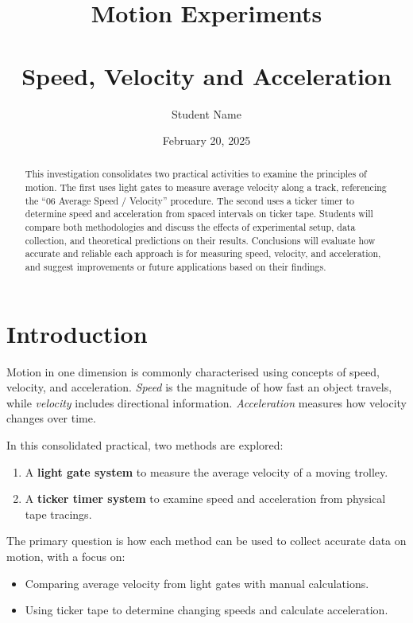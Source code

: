 \documentclass{tufte-handout}
\title{\centering Motion Experiments\\\\Speed, Velocity and Acceleration}
\author{Student Name}
\date{February 20, 2025}
\begin{document}
\maketitle
\pagestyle{fancy}
\fancyhf{} %

\begin{abstract}

This investigation consolidates two practical activities to examine the principles of motion. The first uses light gates to measure average velocity along a track, referencing the “06 Average Speed / Velocity” procedure. The second uses a ticker timer to determine speed and acceleration from spaced intervals on ticker tape. Students will compare both methodologies and discuss the effects of experimental setup, data collection, and theoretical predictions on their results. Conclusions will evaluate how accurate and reliable each approach is for measuring speed, velocity, and acceleration, and suggest improvements or future applications based on their findings.
\end{abstract}

\section{Introduction}
Motion in one dimension is commonly characterised using concepts of speed, velocity, and acceleration.
\emph{Speed} is the magnitude of how fast an object travels, while
\emph{velocity} includes directional information.
\emph{Acceleration} measures how velocity changes over time.

In this consolidated practical, two methods are explored:
\begin{enumerate}
  \item A \textbf{light gate system} to measure the average velocity of a moving trolley.
  \item A \textbf{ticker timer system} to examine speed and acceleration from physical tape tracings.
\end{enumerate}

The primary question is how each method can be used to collect accurate data on motion, with a focus on:
\begin{itemize}
  \item Comparing average velocity from light gates with manual calculations.
  \item Using ticker tape to determine changing speeds and calculate acceleration.
\end{itemize}
\end{document}
